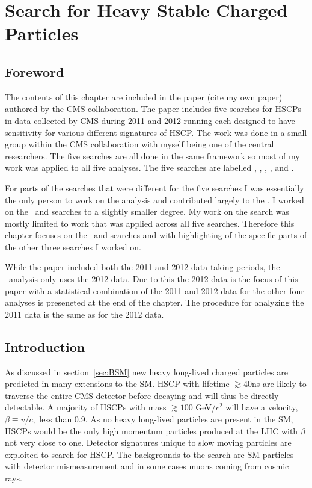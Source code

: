 \chapter{Search for Heavy Stable Charged Particles \label{sec:search}}

\section{Foreword}
The contents of this chapter are included in the paper (cite my own paper) authored by the CMS collaboration. The paper includes five searches for HSCPs in data collected
by CMS during 2011 and 2012 running each designed to have sensitivity for various different signatures of HSCP. The work was done in a small group within the CMS collaboration
with myself being one of the central researchers. The five searches are all done in the same framework
so most of my work was applied to all five analyses. The five searches are labelled \muononly, \tktof, \tkonly, \multi, and \fract. 

For parts of the searches that were different for the five searches I was essentially the only person to work on the \muononly analysis and contributed largely to the \tktof.
I worked on the \tkonly\ and \multi searches to a slightly smaller degree. My work on the \fract search was mostly limited to work that was applied across all five searches. 
Therefore this chapter focuses on the \muononly\ and \tktof searches and with highlighting of the specific parts of the other three searches I worked on.

While the paper included both the 2011 and 2012 data taking periods, the \muononly\ analysis only uses the 2012 data. Due to this the 2012 data is the focus of this paper
with a statistical combination of the 2011 and 2012 data for the other four analyses is preseneted at the end of the chapter. The procedure for analyzing the 2011 data
is the same as for the 2012 data.

\section{Introduction}
As discussed in section~\ref{sec:BSM} new heavy long-lived charged particles are predicted in many extensions to the SM. HSCP with
lifetime $\gtrsim 40$ns are likely to traverse the entire CMS detector before decaying and will thus be directly detectable.
A majority of HSCPs with mass $\gtrsim 100$ GeV/$c^2$ will have a velocity, $\beta \equiv v/c,$ less than 0.9. 
As no heavy long-lived particles are present in the SM, HSCPs would be the only high momentum particles produced at the LHC with $\beta$ not very close to one.
Detector signatures unique to slow moving particles are exploited to search for HSCP. 
The backgrounds to the search are SM particles with detector mismeasurement and in some cases
muons coming from cosmic rays.

